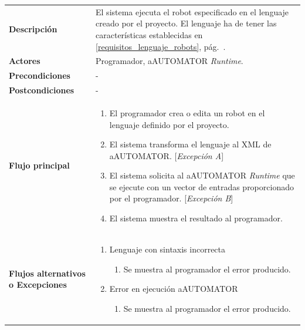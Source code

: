 \begin{tabular}[h]{ p{ } p{ }}

\textbf{Descripción} & El sistema ejecuta el robot especificado en el
lenguaje creado por el proyecto. El lenguaje ha de tener las
características establecidas en \ref{requisitos_lenguaje_robots},
pág.~\pageref{requisitos_lenguaje_robots}.\\[3mm]

\textbf{Actores} & Programador, aAUTOMATOR \emph{Runtime}.\\[3mm]

\textbf{Precondiciones} & - \\[3mm]

\textbf{Postcondiciones} & - \\[3mm]

\textbf{Flujo principal} & \begin{enumerate}[leftmargin=1em,topsep=0pt, partopsep=0pt]
  \item El programador crea o edita un robot en el lenguaje definido
    por el proyecto.
  \item El sistema transforma el lenguaje al XML de
    aAUTOMATOR. [\emph{Excepción A}]
  \item El sistema solicita al aAUTOMATOR \emph{Runtime} que se
    ejecute con un vector de entradas proporcionado por el
    programador. [\emph{Excepción B}]
  \item El sistema muestra el resultado al programador.
\end{enumerate}\\[3mm]

\textbf{Flujos alternativos o Excepciones} &
\begin{enumerate}[label=\Alph*:,leftmargin=1em,topsep=0pt, partopsep=0pt]
\item Lenguaje con sintaxis incorrecta
  \begin{enumerate}[label=\arabic*.,topsep=0pt, partopsep=0pt]
    \item Se muestra al programador el error producido.
  \end{enumerate}
\item Error en ejecución aAUTOMATOR
  \begin{enumerate}[label=\arabic*.,topsep=0pt, partopsep=0pt]
    \item Se muestra al programador el error producido.
  \end{enumerate}
\end{enumerate}\\[3mm]
\end{tabular}

